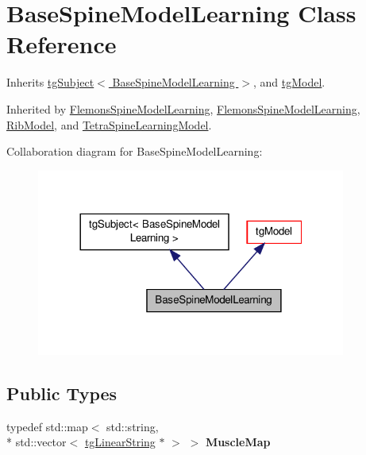 \hypertarget{class_base_spine_model_learning}{\section{Base\-Spine\-Model\-Learning Class Reference}
\label{class_base_spine_model_learning}
}


Inherits \hyperlink{classtg_subject}{tg\-Subject$<$ Base\-Spine\-Model\-Learning $>$}, and \hyperlink{classtg_model}{tg\-Model}.



Inherited by \hyperlink{class_flemons_spine_model_learning}{Flemons\-Spine\-Model\-Learning}, \hyperlink{class_flemons_spine_model_learning}{Flemons\-Spine\-Model\-Learning}, \hyperlink{class_rib_model}{Rib\-Model}, and \hyperlink{class_tetra_spine_learning_model}{Tetra\-Spine\-Learning\-Model}.



Collaboration diagram for Base\-Spine\-Model\-Learning\-:\nopagebreak
\begin{figure}[H]
\begin{center}
\leavevmode
\includegraphics[width=288pt]{class_base_spine_model_learning__coll__graph}
\end{center}
\end{figure}
\subsection*{Public Types}
\begin{DoxyCompactItemize}
\item 
\hypertarget{class_base_spine_model_learning_a0f779ad979f0353d68af012f50f822b7}{typedef std\-::map$<$ std\-::string, \\*
std\-::vector$<$ \hyperlink{classtg_linear_string}{tg\-Linear\-String} $\ast$ $>$ $>$ {\bfseries Muscle\-Map}}\label{class_base_spine_model_learning_a0f779ad979f0353d68af012f50f822b7}

\end{DoxyCompactItemize}

